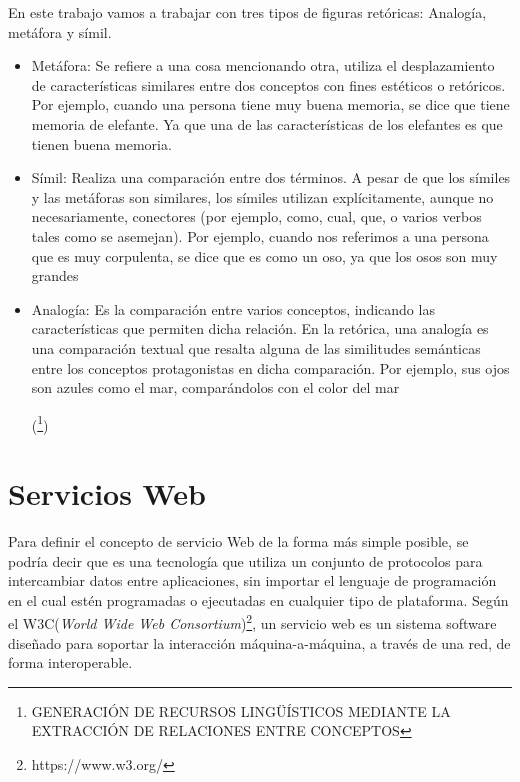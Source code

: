 En este trabajo vamos a trabajar con tres tipos de figuras retóricas: Analogía, metáfora y símil.
\begin{itemize}
	\item Metáfora: Se refiere a una cosa mencionando otra, utiliza el desplazamiento de características similares entre dos conceptos con fines estéticos o retóricos. Por ejemplo, cuando una persona tiene muy buena memoria, se dice que tiene memoria de elefante. Ya que una de las características de los elefantes es que tienen buena memoria.
	
	\item Símil: Realiza una comparación entre dos términos. A pesar de que los símiles y las metáforas son similares, los símiles utilizan explícitamente, aunque no necesariamente, conectores (por ejemplo, como, cual, que, o varios verbos tales como se asemejan).
	Por ejemplo, cuando nos referimos a una persona que es muy corpulenta, se dice que es como un oso, ya que los osos son muy grandes
	
	\item Analogía: Es la comparación entre varios conceptos, indicando las características que permiten dicha relación. En la retórica, una analogía es una comparación textual que resalta alguna de las similitudes semánticas entre los conceptos protagonistas en dicha comparación. Por ejemplo, sus ojos son azules como el mar, comparándolos con el color del mar
	
	(\footnote {GENERACIÓN DE RECURSOS LINGÜÍSTICOS MEDIANTE LA EXTRACCIÓN DE RELACIONES ENTRE CONCEPTOS})	
	
\end{itemize}

\section{Servicios Web}
\label{cap:sec:servicios_web}

Para definir el concepto de servicio Web de la forma más simple posible, se podría decir que es una tecnología que utiliza un conjunto de protocolos para intercambiar datos entre aplicaciones, sin importar el lenguaje de programación en el cual estén programadas o ejecutadas en cualquier tipo de plataforma. Según el W3C(\textit{World Wide Web Consortium})\footnote{https://www.w3.org/}, un servicio web es un sistema software diseñado para soportar la interacción máquina-a-máquina, a través de una red, de forma interoperable. \\



